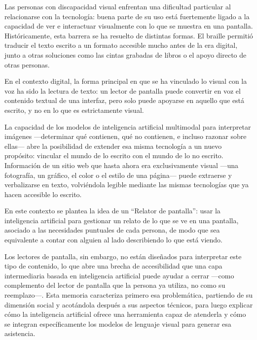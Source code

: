 
Las personas con discapacidad visual enfrentan una dificultad particular al relacionarse con la tecnología: buena parte de su uso está fuertemente ligado a la capacidad de ver e interactuar visualmente con lo que se muestra en una pantalla. Históricamente, esta barrera se ha resuelto de distintas formas. El braille permitió traducir el texto escrito a un formato accesible mucho antes de la era digital, junto a otras soluciones como las cintas grabadas de libros o el apoyo directo de otras personas.

En el contexto digital, la forma principal en que se ha vinculado lo visual con la voz ha sido la lectura de texto: un lector de pantalla puede convertir en voz el contenido textual de una interfaz, pero solo puede apoyarse en aquello que está escrito, y no en lo que es estrictamente visual.

La capacidad de los modelos de inteligencia artificial multimodal para interpretar imágenes —determinar qué contienen, qué no contienen, e incluso razonar sobre ellas— abre la posibilidad de extender esa misma tecnología a un nuevo propósito: vincular el mundo de lo escrito con el mundo de lo no escrito. Información de un sitio web que hasta ahora era exclusivamente visual —una fotografía, un gráfico, el color o el estilo de una página— puede extraerse y verbalizarse en texto, volviéndola legible mediante las mismas tecnologías que ya hacen accesible lo escrito.

En este contexto se plantea la idea de un ``Relator de pantalla'': usar la inteligencia artificial para gestionar un relato de lo que se ve en una pantalla, asociado a las necesidades puntuales de cada persona, de modo que sea equivalente a contar con alguien al lado describiendo lo que está viendo.

Los lectores de pantalla, sin embargo, no están diseñados para interpretar este tipo de contenido, lo que abre una brecha de accesibilidad que una capa intermediaria basada en inteligencia artificial puede ayudar a cerrar —como complemento del lector de pantalla que la persona ya utiliza, no como su reemplazo—. Esta memoria caracteriza primero esa problemática, partiendo de su dimensión social y acotándola después a sus aspectos técnicos, para luego explicar cómo la inteligencia artificial ofrece una herramienta capaz de atenderla y cómo se integran específicamente los modelos de lenguaje visual para generar esa asistencia.

